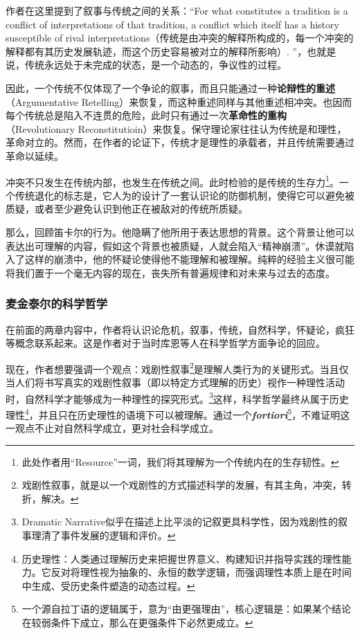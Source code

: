 \documentclass[12pt, a4paper, oneside]{ctexart}
\renewcommand{\b}{\textbf}
\newcommand{\f}{\footnote}
\begin{document}
作者在这里提到了叙事与传统之间的关系：“For what constitutes a tradition is a conflict of interpretations of that tradition, a conflict which itself has a history susceptible of rival interpretations（传统是由冲突的解释所构成的，每一个冲突的解释都有其历史发展轨迹，而这个历史容易被对立的解释所影响）. ”，也就是说，传统永远处于未完成的状态，是一个动态的，争议性的过程。

因此，一个传统不仅体现了一个争论的叙事，而且只能通过一种\b{论辩性的重述}（Argumentative Retelling）来恢复，而这种重述同样与其他重述相冲突。也因而每个传统总是陷入不连贯的危险，此时只有通过一次\b{革命性的重构}（Revolutionary Reconstitutioin）来恢复。保守理论家往往认为传统是和理性，革命对立的。然而，在作者的论证下，传统才是理性的承载者，并且传统需要通过革命以延续。

冲突不只发生在传统内部，也发生在传统之间。此时检验的是传统的生存力\f{此处作者用“Resource”一词，我们将其理解为一个传统内在的生存韧性。}。一个传统退化的标志是，它人为的设计了一套认识论的防御机制，使得它可以避免被质疑，或者至少避免认识到他正在被敌对的传统所质疑。

那么，回顾笛卡尔的行为。他隐瞒了他所用于表达思想的背景。这个背景让他可以表达出可理解的内容，假如这个背景也被质疑，人就会陷入“精神崩溃”。休谟就陷入了这样的崩溃中，他的怀疑论使得他不能理解和被理解。纯粹的经验主义很可能将我们置于一个毫无内容的现在，丧失所有普遍规律和对未来与过去的态度。

\subsubsection{麦金泰尔的科学哲学}

在前面的两章内容中，作者将认识论危机，叙事，传统，自然科学，怀疑论，疯狂等概念联系起来。这是作者对于当时库恩等人在科学哲学方面争论的回应。

现在，作者想要强调一个观点：戏剧性叙事\f{戏剧性叙事，就是以一个戏剧性的方式描述科学的发展，有其主角，冲突，转折，解决。}是理解人类行为的关键形式。当且仅当人们将书写真实的戏剧性叙事（即以特定方式理解的历史）视作一种理性活动时，自然科学才能够成为一种理性的探究形式。\f{Dramatic Narrative似乎在描述上比平淡的记叙更具科学性，因为戏剧性的叙事理清了事件发展的逻辑和评价。}这样，科学哲学最终从属于历史理性\f{历史理性：人类通过理解历史来把握世界意义、构建知识并指导实践的理性能力。它反对将理性视为抽象的、永恒的数学逻辑，而强调理性本质上是在时间中生成、受历史条件塑造的动态过程。}，并且只在历史理性的语境下可以被理解。通过一个\textit{\b{fortiori}}\f{一个源自拉丁语的逻辑属于，意为“由更强理由”，核心逻辑是：如果某个结论在较弱条件下成立，那么在更强条件下必然更成立。}，不难证明这一观点不止对自然科学成立，更对社会科学成立。
\end{document}
